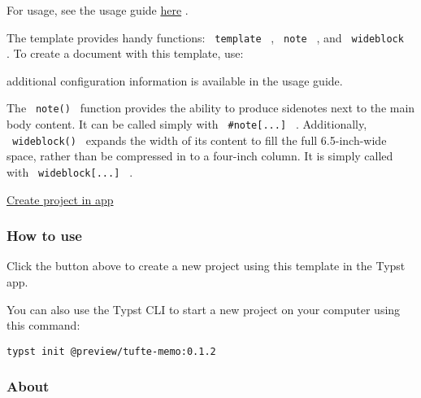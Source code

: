 For usage, see the usage guide
\href{https://github.com/nogula/tufte-memo/blob/main/template/main.pdf}{here}
.

The template provides handy functions: \texttt{\ template\ } ,
\texttt{\ note\ } , and \texttt{\ wideblock\ } . To create a document
with this template, use:

\begin{Shaded}
\begin{Highlighting}[]

\NormalTok{        (}
\NormalTok{        ),}
\NormalTok{    )}
\NormalTok{)}
\end{Highlighting}
\end{Shaded}

additional configuration information is available in the usage guide.

The \texttt{\ note()\ } function provides the ability to produce
sidenotes next to the main body content. It can be called simply with
\texttt{\ \#note{[}...{]}\ } . Additionally, \texttt{\ wideblock()\ }
expands the width of its content to fill the full 6.5-inch-wide space,
rather than be compressed in to a four-inch column. It is simply called
with \texttt{\ wideblock{[}...{]}\ } .

\href{/app?template=tufte-memo&version=0.1.2}{Create project in app}

\subsubsection{How to use}\label{how-to-use}

Click the button above to create a new project using this template in
the Typst app.

You can also use the Typst CLI to start a new project on your computer
using this command:

\begin{verbatim}
typst init @preview/tufte-memo:0.1.2
\end{verbatim}



\subsubsection{About}\label{about}

